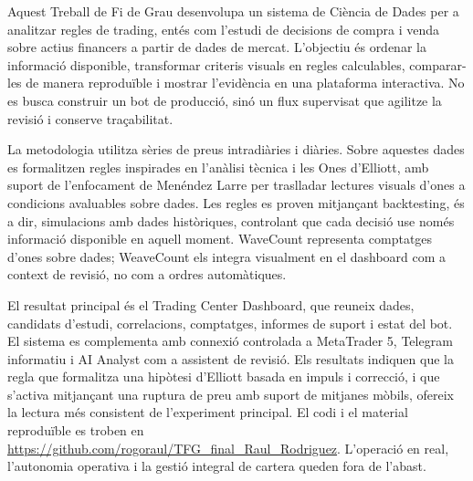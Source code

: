 \documentclass[twoside,spanish,a4paper,12pt]{tfg}
\makeatletter
\renewcommand{\cleardoublepage}{%
  \clearpage
  \if@twoside
    \ifodd\c@page
    \else
      \thispagestyle{empty}%
      \hbox{}%
      \newpage
      \if@twocolumn\hbox{}\newpage\fi
    \fi
  \fi
}
\makeatother
\begin{document}
{}
\begin{resum}
Aquest Treball de Fi de Grau desenvolupa un sistema de Ci\`encia de Dades per a
analitzar regles de trading, ent\'es com l'estudi de decisions de compra i venda
sobre actius financers a partir de dades de mercat. L'objectiu \'es ordenar la
informaci\'o disponible, transformar criteris visuals en regles calculables,
comparar-les de manera reprodu\"ible i mostrar l'evid\`encia en una plataforma
interactiva. No es busca construir un bot de producci\'o, sin\'o un flux supervisat
que agilitze la revisi\'o i conserve tra\c{c}abilitat.

La metodologia utilitza s\`eries de preus intradi\`aries i di\`aries. Sobre aquestes
dades es formalitzen regles inspirades en l'an\`alisi t\`ecnica i les Ones
d'Elliott, amb suport de l'enfocament de Men\'endez Larre per traslladar lectures
visuals d'ones a condicions avaluables sobre dades. Les regles es proven
mitjan\c{c}ant backtesting, \'es a dir, simulacions amb dades hist\`oriques,
controlant que cada decisi\'o use nom\'es informaci\'o disponible en aquell moment.
WaveCount representa comptatges d'ones sobre dades; WeaveCount els integra
visualment en el dashboard com a context de revisi\'o, no com a ordres
autom\`atiques.

El resultat principal \'es el Trading Center Dashboard, que reuneix dades,
candidats d'estudi, correlacions, comptatges, informes de suport i estat del
bot. El sistema es complementa amb connexi\'o controlada a MetaTrader 5, Telegram
informatiu i AI Analyst com a assistent de revisi\'o. Els resultats indiquen que
la regla que formalitza una hip\`otesi d'Elliott basada en impuls i correcci\'o, i
que s'activa mitjan\c{c}ant una ruptura de preu amb suport de mitjanes m\`obils,
ofereix la lectura m\'es consistent de l'experiment principal. El codi i el
material reprodu\"ible es troben en
\url{https://github.com/rogoraul/TFG_final_Raul_Rodriguez}. L'operaci\'o en real,
l'autonomia operativa i la gesti\'o integral de cartera queden fora de l'abast.
\end{resum}
\cleardoublepage

\pagestyle{empty}
\tableofcontents
\cleardoublepage

{}
\listoffigures
\cleardoublepage

{}
\listoftables
\end{document}
